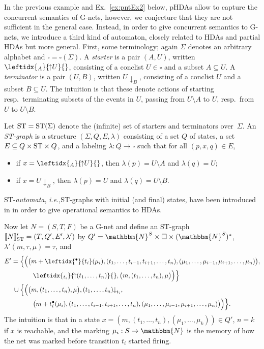 \documentclass[runningheads,envcountsame]{llncs}
\newcommand*\ie{\textit{i.e.},}
\newcommand*\Nat{\mathbbm{N}}
\newcommand*\prepla[1]{\leftidx{^\bullet}{#1}}
\newcommand*\pospla[1]{#1^\bullet}
\newcommand*\sem[1]{\llbracket #1\rrbracket}
\newcommand*\starter[2]{\leftidx{_{#2}}{{\hspace*{-.3ex}\uparrow}#1}{}}
\newcommand*\terminator[2]{{#1}{\downarrow}_{#2}}
\newcommand*\ST{\textup{ST}}
\begin{document}
In the previous example and Ex.~\ref{ex:pntEx2} below, pHDAs allow to capture the concurrent semantics of G-nets,
however, we conjecture that they are not sufficient in the general case. 
Instead, in order to give concurrent semantics to G-nets,
we introduce a third kind of automaton, closely related to HDAs and partial HDAs but more general.
First, some terminology; again $\Sigma$ denotes an arbitrary alphabet and $\square=\square(\Sigma)$.
A \emph{starter} is a pair $(A, U)$, written $\starter{U}{A}$, consisting of a conclist $U\in \square$ and a subset $A\subseteq U$.
A \emph{terminator} is a pair $(U, B)$, written $\terminator{U}{B}$, consisting of a conclist $U$ and a subset $B\subseteq U$.
The intuition is that these denote actions of starting resp.\ terminating subsets of the events in $U$,
passing from $U\setminus A$ to $U$, resp.\ from $U$ to $U\setminus B$.

Let $\ST=\ST(\Sigma)$ denote the (infinite) set of starters and terminators over~$\Sigma$.
An \emph{ST-graph} is a structure $(\Sigma, Q, E, \lambda)$ consisting of
a set $Q$ of states,
a set $E\subseteq Q\times \ST\times Q$,
and a labeling $\lambda: Q\to \square$
such that for all $(p, x, q)\in E$,
\begin{itemize}
\item if $x=\starter{U}{A}$, then $\lambda(p)=U\setminus A$ and $\lambda(q)=U$;
\item if $x=\terminator{U}{B}$, then $\lambda(p)=U$ and $\lambda(q)=U\setminus B$.
\end{itemize}
ST-\emph{automata}, \ie ST-graphs with initial (and final) states,
have been introduced in \cite{conf/ramics/AmraneBCFZ24} in order to give operational semantics to HDAs.

Now let $N=(S, T, F)$ be a G-net and define an ST-graph $\sem{N}_\ST'=(T, Q', E', \lambda')$ by
$Q'=\Nat^S\times \square\times (\Nat^S)^*$, $\lambda'(m, \tau, \mu)=\tau$,
and
\begin{align*}
  E' = {}
  &\Big\{\Big(\big(m+\prepla{t_i}(\mu_i), (t_1,\dots, t_{i-1}, t_{i+1},\dots, t_n), (\mu_1,\dots, \mu_{i-1}, \mu_{i+1},\dots, \mu_n)\big), \\
  &\qquad \starter{(t_1,\dots, t_n)}{t_i}, \big(m, (t_1,\dots, t_n), \mu\big)\Big)\Big\}
  \\
  {}\cup{}
  &\Big\{\Big(\big(m, (t_1,\dots, t_n), \mu\big), \terminator{(t_1,\dots, t_n)}{t_i}, \\
  &\qquad \big(m+\pospla{t_i}(\mu_i), (t_1,\dots, t_{i-1}, t_{i+1},\dots, t_n), (\mu_1,\dots, \mu_{i-1}, \mu_{i+1},\dots, \mu_n)\big)\Big)\Big\}.
\end{align*}
The intuition is that in a state $x=(m, (t_1,\dotsc, t_n), (\mu_1,\dotsc, \mu_k))\in Q'$,
$n=k$ if $x$ is reachable, and
the marking $\mu_i: S\to \Nat$ is the memory of how the net was marked before transition $t_i$ started firing.
\end{document}
